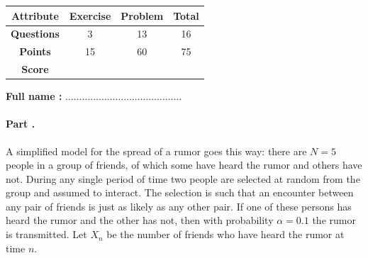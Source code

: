 \documentclass[article,12pt,a4paper]{article}
\begin{document}
	\bigskip
	\begin{center}
		\renewcommand{\arraystretch}{2.5} 
		\begin{tabular}{|c|c|c|c|}
			\hline
			\textbf{Attribute} & \textbf{Exercise} & \textbf{Problem}  & \textbf{\quad Total\quad}  \\
			\hline
			\textbf{Questions} & 3 & 13 & 16  \\
			\hline
			\textbf{Points} & 15 & 60 &  75 \\
			\hline
			\textbf{Score} & &  & \\
			\hline
		\end{tabular}
		
	\end{center}
	
	\bigskip
	
	\bigskip
	
	\bigskip
	
	\begin{center}
		\Large{\textbf{Full name : }} $\ldots\ldots\ldots\ldots\ldots\ldots\ldots\ldots\ldots\ldots\ldots\ldots\ldots\ldots$
	\end{center}
	
	\iffalse
	\paragraph{Part \thenum.}
	A simplified model for the spread of a rumor goes this way: there are $N = 5$ people in a group of friends, of which some have heard the rumor
	and others have not. 
	During any single period of time two people are selected at random
	from the group and assumed to interact. 
	The selection is such that an encounter between any pair of friends is just as likely as any other pair. 
	If one of these persons has heard the rumor and the other has not, then with probability $\alpha = 0.1$ the rumor is transmitted. 
	Let $X_n$ be the number of friends who have heard the rumor at time $n$. 
	
\end{document}
